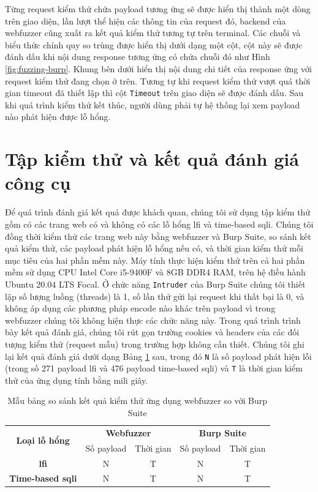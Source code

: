 Từng request kiểm thử chứa payload tương ứng sẽ được hiển thị thành một dòng trên giao diện, lần lượt thể hiện các thông tin của request đó, backend của webfuzzer cũng xuất ra kết quả kiểm thử tương tự trên terminal. Các chuỗi và biểu thức chính quy so trùng được hiển thị dưới dạng một cột, cột này sẽ được đánh dấu khi nội dung response tương ứng có chứa chuỗi đó như Hình \ref{fig:fuzzing-burp}. Khung bên dưới hiển thị nội dung chi tiết của response ứng với request kiểm thử đang chọn ở trên. Tương tự khi request kiểm thử vượt quá thời gian timeout đã thiết lập thì cột \texttt{Timeout} trên giao diện sẽ được đánh dấu. Sau khi quá trình kiểm thử kết thúc, người dùng phải tự hệ thống lại xem payload nào phát hiện được lỗ hổng.\par
\section{Tập kiểm thử và kết quả đánh giá công cụ}
Để quá trình đánh giá kết quả được khách quan, chúng tôi sử dụng tập kiểm thử gồm có các trang web có và không có các lỗ hổng \acrshort{lfi} và time-based \acrshort{sqli}. Chúng tôi đồng thời kiểm thử các trang web này bằng webfuzzer và Burp Suite, so sánh kết quả kiểm thử, các payload phát hiện lỗ hổng nếu có, và thời gian kiểm thử mỗi mục tiêu của hai phần mềm này. Máy tính thực hiện kiểm thử trên cả hai phần mềm sử dụng CPU Intel Core i5-9400F và 8GB DDR4 RAM, trên hệ điều hành Ubuntu 20.04 LTS Focal. Ở chức năng \texttt{Intruder} của Burp Suite chúng tôi thiết lập số lượng luồng (threads) là 1, số lần thử gửi lại request khi thất bại là 0, và không áp dụng các phương pháp encode nào khác trên payload vì trong webfuzzer chúng tôi không hiện thực các chức năng này. Trong quá trình trình bày kết quả đánh giá, chúng tôi rút gọn trường cookies và headers của các đối tượng kiểm thử (request mẫu) trong trường hợp không cần thiết. Chúng tôi ghi lại kết quả đánh giá dưới dạng Bảng \ref{tab:sample-testing-results} sau, trong đó \texttt{N} là số payload phát hiện lỗi (trong số 271 payload \acrshort{lfi} và 476 payload time-based \acrshort{sqli}) và \texttt{T} là thời gian kiểm thử của ứng dụng tính bằng mili giây.
\FloatBarrier
\begin{table}[ht]
    \centering
    \caption{Mẫu bảng so sánh kết quả kiểm thử ứng dụng webfuzzer so với Burp Suite}
    \label{tab:sample-testing-results}
    \begin{tabular}[ht]{ccccc}
        \toprule[1pt]\midrule[0.3pt]
            \multirow{2}{*}{\textbf{Loại lỗ hổng}}&\multicolumn{2}{c}{\textbf{Webfuzzer}}&\multicolumn{2}{c}{\textbf{Burp Suite}}\\
            \cmidrule(lr){2-3}\cmidrule(lr){4-5}{}&Số payload&Thời gian&Số payload&Thời gian\\
        \midrule[0.3pt]
            \textbf{\acrshort{lfi}}&N&T&N&T\\\addlinespace
            \textbf{Time-based \acrshort{sqli}}&N&T&N&T\\
        \midrule[0.3pt]\bottomrule[1pt]
    \end{tabular}
\end{table}
